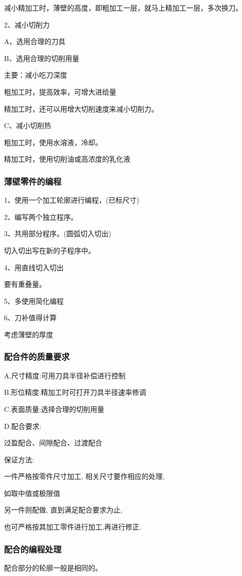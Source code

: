 减小精加工时，薄壁的高度，即粗加工一层，就马上精加工一层，多次换刀。

2、减小切削力

A、选用合理的刀具

B、选用合理的切削用量

主要：减小吃刀深度

粗加工时，提高效率，可增大进给量

精加工时，还可以用增大切削速度来减小切削力。

C、减小切削热

粗加工时，使用水溶液，冷却。

精加工时，使用切削油或高浓度的乳化液

\subsubsection{薄壁零件的编程}

1、使用一个加工轮廓进行编程，(已标尺寸)

2、编写两个独立程序。

3、共用部分程序。(圆弧切入切出)

切入切出写在新的子程序中。

4、用直线切入切出

要有重叠量。

5、多使用简化编程

6、刀补值得计算

考虑薄壁的厚度


\subsubsection{配合件的质量要求}
A.尺寸精度:可用刀具半径补偿进行控制

B.形位精度:精加工时可打开刀具半径速率修调

C.表面质量:选择合理的切削用量

D.配合要求:

过盈配合、间隙配合、过渡配合

保证方法:

一件严格按零件尺寸加工, 相关尺寸要作相应的处理,

如取中值或极限值

另一件则配做, 直到满足配合要求为止,

也可严格按其加工零件进行加工,再进行修正.

\subsubsection{配合的编程处理}
配合部分的轮廓一般是相同的。


